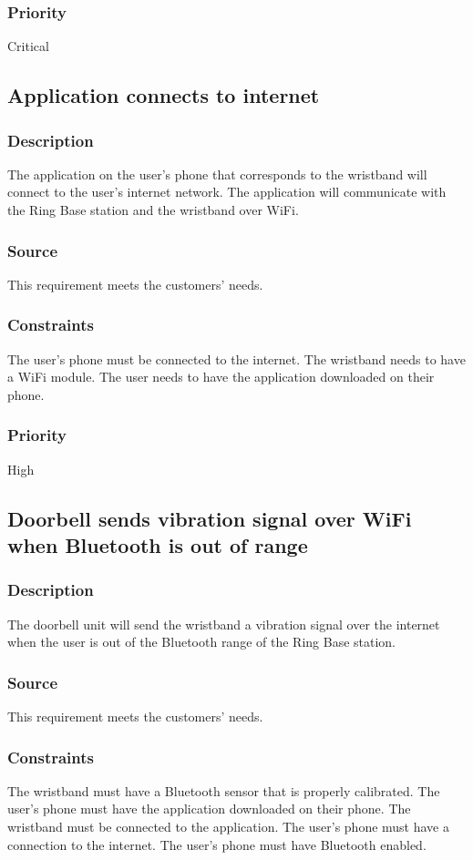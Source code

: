 \subsubsection{Priority}
Critical 

\subsection{Application connects to internet}
\subsubsection{Description}
The application on the user's phone that corresponds to the wristband will connect to the user's internet network. The application will communicate with the Ring Base station and the wristband over WiFi.
\subsubsection{Source}
This requirement meets the customers' needs.
\subsubsection{Constraints}
The user's phone must be connected to the internet. The wristband needs to have a WiFi module. The user needs to have the application downloaded on their phone. 
\subsubsection{Priority}
High

\subsection{Doorbell sends vibration signal over WiFi when Bluetooth is out of range}
\subsubsection{Description}
The doorbell unit will send the wristband a vibration signal over the internet when the user is out of the Bluetooth range of the Ring Base station. 
\subsubsection{Source}
This requirement meets the customers' needs.
\subsubsection{Constraints}
The wristband must have a Bluetooth sensor that is properly calibrated. The user's phone must have the application downloaded on their phone. The wristband must be connected to the application. The user's phone must have a connection to the internet. The user's phone must have Bluetooth enabled. 

